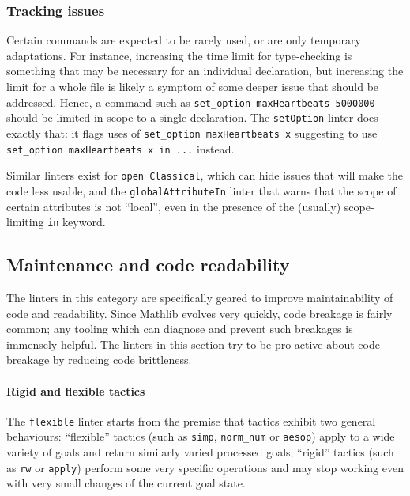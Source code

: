\documentclass[runningheads]{llncs}
\def\mathlib{Mathlib\xspace}
\newcommand{\lean}[1]{\texttt{#1}}
\begin{document}
\subsubsection{Tracking issues}

Certain commands are expected to be rarely used, or are only temporary adaptations.
For instance, increasing the time limit for type-checking is something that may be necessary for an individual declaration,
but increasing the limit for a whole file is likely a symptom of some deeper issue that should be addressed.
Hence, a command such as \lean{set_option maxHeartbeats 5000000} should be limited in scope to a single declaration.
The \lean{setOption} linter does exactly that: it flags uses of \lean{set_option maxHeartbeats x} suggesting to use \lean{set_option maxHeartbeats x in ...} instead.

Similar linters exist for \lean{open Classical}, which can hide issues that will make the code less usable,
and the \lean{globalAttributeIn} linter that warns that the scope of certain attributes is not ``local'', even in the presence of the (usually) scope-limiting \lean{in} keyword.

\subsection{Maintenance and code readability}

The linters in this category are specifically geared to improve maintainability of code and readability.
Since \mathlib evolves very quickly, code breakage is fairly common; any tooling which can diagnose and prevent such breakages is immensely helpful.
The linters in this section try to be pro-active about code breakage by reducing code brittleness.

\paragraph{Rigid and flexible tactics}
The \lean{flexible} linter starts from the premise that tactics exhibit two general behaviours:
``flexible'' tactics (such as \lean{simp}, \lean{norm_num} or \lean{aesop}) apply to a wide variety of goals and return similarly varied processed goals;
``rigid'' tactics (such as \lean{rw} or \lean{apply}) perform some very specific operations and may stop working even with very small changes of the current goal state.
\end{document}
